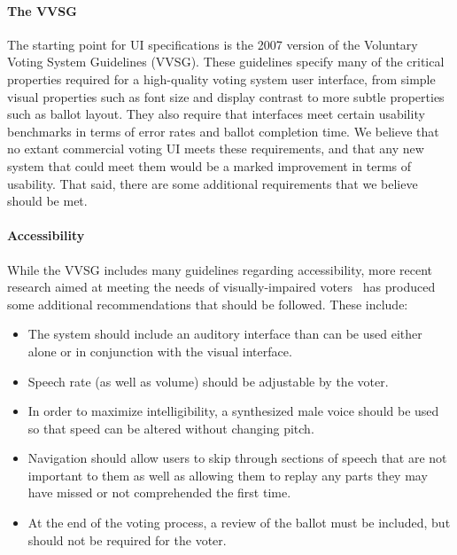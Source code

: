\documentclass[letterpaper, 10pt, twocolumn]{article}
\begin{document}
\paragraph{The VVSG}
The starting point for UI specifications is the 2007 version of the Voluntary Voting System Guidelines (VVSG). These guidelines specify many of the critical properties required for a high-quality voting system user interface, from simple visual properties such as font size and display contrast to more subtle properties such as ballot layout. They also require that interfaces meet certain usability benchmarks in terms of error rates and ballot completion time. We believe that no extant commercial voting UI meets these requirements, and that any new system that could meet them would be a marked improvement in terms of usability. That said, there are some additional requirements that we believe should be met. 
\paragraph{Accessibility}
While the VVSG includes many guidelines regarding accessibility, more recent research aimed at meeting the needs of visually-impaired voters~\cite{piner-11} has produced some additional recommendations that should be followed. These include:
\begin{itemize}
\item  The system should include an auditory interface than can be used either alone or in conjunction with the visual interface. 
\item Speech rate (as well as volume) should be adjustable by the voter. 
\item In order to maximize intelligibility, a synthesized male voice should be used so that speed can be altered without changing pitch. 
\item Navigation should allow users to skip through sections of speech that are not important to them as well as allowing them to replay any parts they may have missed or not comprehended the first time.
\item At the end of the voting process, a review of the ballot must be included, but should not be required for the voter. 
\end{itemize}
\end{document}
